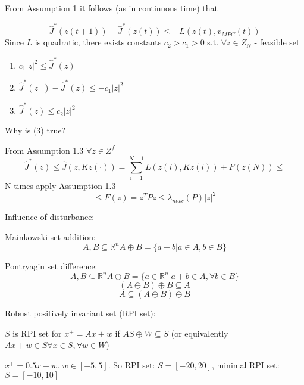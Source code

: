 From Assumption 1 it follows (as in continuous time) that 

\begin{equation*}
\hat J^*(z(t+1)) - \hat J^*(z(t)) \leq - L(z(t), v_{MPC}(t))
\end{equation*}
Since $L$ is quadratic, there exists constants $c_2 > c_1 > 0$ s.t. $\forall z \in Z_N $ - feasible set
\begin{enumerate}
\item $c_1|z|^2 \leq \hat J^*(z)$
\item $\hat J^*(z^+) - \hat J^*(z) \leq - c_1 |z|^2$
\item $\hat J^*(z) \leq c_2|z|^2$
\end{enumerate}

Why is (3) true?

From Assumption 1.3 $\forall z \in Z^f$
\begin{equation*}
\hat J^*(z) \leq \hat J(z,Kz(\cdot)) = \sum_{i=1}^{N-1}L(z(i),Kz(i)) + F(z(N)) \leq 
\end{equation*}
N times apply Assumption 1.3
\begin{equation*}
\leq F(z) = z^TPz \leq \lambda_{max}(P)|z|^2
\end{equation*}

Influence of disturbance:
\begin{Definition}
Mainkowski set addition: 
\begin{equation*}
A,B \subseteq \mathbb{R}^n A \oplus B = \{ a+b | a \in A, b\in B\}
\end{equation*}

Pontryagin set difference:
\begin{equation*}
A, B \subseteq \mathbb{R}^n A \ominus B = \{ a \in \mathbb{R}^n| a+b \in A, \forall b \in B\}
\end{equation*}
\begin{equation*}
(A \ominus B) \oplus B \subseteq A
\end{equation*}
\begin{equation*}
A \subseteq (A \oplus B) \ominus B
\end{equation*}
\end{Definition}
\begin{Definition}

Robust positively invariant set (RPI set):

$S$ is RPI set for $x^+=Ax+w$ if $AS \oplus W \subseteq S$ (or equivalently $Ax+w \in S \forall x \in S, \forall w \in W$)
\end{Definition}
\begin{Example}

$x^+ = 0.5x + w$. $w \in [-5,5]$. So RPI set: $S = [-20, 20]$, minimal RPI set: $S = [-10,10]$
\end{Example}

